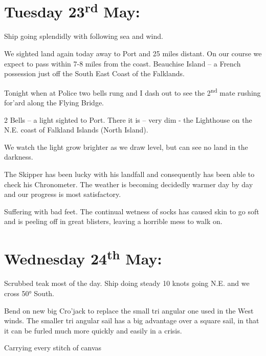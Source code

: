 \documentclass[
  11pt,
  msmallroyalvopaper
]{memoir}
\begin{document}
\hypertarget{tuesday-23rd-may}{%
\section{\texorpdfstring{Tuesday 23\textsuperscript{rd}
May:}{Tuesday 23rd May:}}\label{tuesday-23rd-may}}

Ship going splendidly with following sea and wind.

We sighted land again today away to Port and 25 miles distant. On our
course we expect to pass within 7-8 miles from the coast. Beauchise
Island -- a French possession just off the South East Coast of the
Falklands.

Tonight when at Police two bells rung and I dash out to see the
2\textsuperscript{nd} mate rushing for'ard along the Flying Bridge.

2 Bells -- a light sighted to Port. There it is -- very dim - the
Lighthouse on the N.E. coast of Falkland Islands (North Island).

We watch the light grow brighter as we draw level, but can see no land
in the darkness.

The Skipper has been lucky with his landfall and consequently has been
able to check his Chronometer. The weather is becoming decidedly warmer
day by day and our progress is most satisfactory.

Suffering with bad feet. The continual wetness of socks has caused skin
to go soft and is peeling off in great blisters, leaving a horrible mess
to walk on.

\hypertarget{wednesday-24th-may}{%
\section{\texorpdfstring{Wednesday 24\textsuperscript{th}
May:}{Wednesday 24th May:}}\label{wednesday-24th-may}}

Scrubbed teak most of the day. Ship doing steady 10 knots going N.E. and
we cross 50° South.

Bend on new big Cro'jack to replace the small tri angular one used in
the West winds. The smaller tri angular sail has a big advantage over a
square sail, in that it can be furled much more quickly and easily in a
crisis.

Carrying every stitch of canvas
\end{document}
